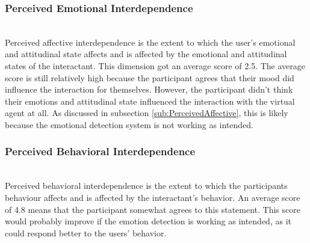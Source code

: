 \subsubsection{Perceived Emotional Interdependence}~\\
Perceived affective interdependence is the extent to which the user’s emotional and attitudinal state affects and is affected by the emotional and attitudinal states of the interactant. This dimension got an average score of 2.5. The average score is still relatively high because the participant agrees that their mood did influence the interaction for themselves. However, the participant didn't think their emotions and attitudinal state influenced the interaction with the virtual agent at all. As discussed in subsection \ref{sub:PerceivedAffective}, this is likely because the emotional detection system is not working as intended.

\subsubsection{Perceived Behavioral Interdependence}~\\
Perceived behavioral interdependence is the extent to which the participants behaviour affects and is affected by the interactant’s behavior. 
An average score of 4.8 means that the participant somewhat agrees to this statement. This score would probably improve if the emotion detection is working as intended, as it could respond better to the users' behavior.

